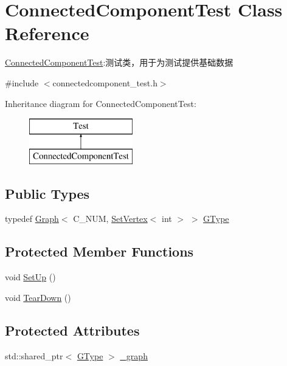 \hypertarget{class_connected_component_test}{}\section{Connected\+Component\+Test Class Reference}
\label{class_connected_component_test}


\hyperlink{class_connected_component_test}{Connected\+Component\+Test}\+:测试类，用于为测试提供基础数据  




{\ttfamily \#include $<$connectedcomponent\+\_\+test.\+h$>$}

Inheritance diagram for Connected\+Component\+Test\+:\begin{figure}[H]
\begin{center}
\leavevmode
\includegraphics[height=2.000000cm]{class_connected_component_test}
\end{center}
\end{figure}
\subsection*{Public Types}
\begin{DoxyCompactItemize}
\item 
typedef \hyperlink{struct_introduction_to_algorithm_1_1_graph_algorithm_1_1_graph}{Graph}$<$ C\+\_\+\+N\+U\+M, \hyperlink{struct_introduction_to_algorithm_1_1_graph_algorithm_1_1_set_vertex}{Set\+Vertex}$<$ int $>$ $>$ \hyperlink{class_connected_component_test_a819b25542e9db5882ec64edb3bb78ff7}{G\+Type}
\end{DoxyCompactItemize}
\subsection*{Protected Member Functions}
\begin{DoxyCompactItemize}
\item 
void \hyperlink{class_connected_component_test_afd13b98fdaada57ea00e2bbde46144e2}{Set\+Up} ()
\item 
void \hyperlink{class_connected_component_test_a677db9fd4b9c973df7b78b402bf0a0f6}{Tear\+Down} ()
\end{DoxyCompactItemize}
\subsection*{Protected Attributes}
\begin{DoxyCompactItemize}
\item 
std\+::shared\+\_\+ptr$<$ \hyperlink{class_connected_component_test_a819b25542e9db5882ec64edb3bb78ff7}{G\+Type} $>$ \hyperlink{class_connected_component_test_a0f05d0ae37619e84f604aa51aa20cd28}{\+\_\+graph}
\end{DoxyCompactItemize}


